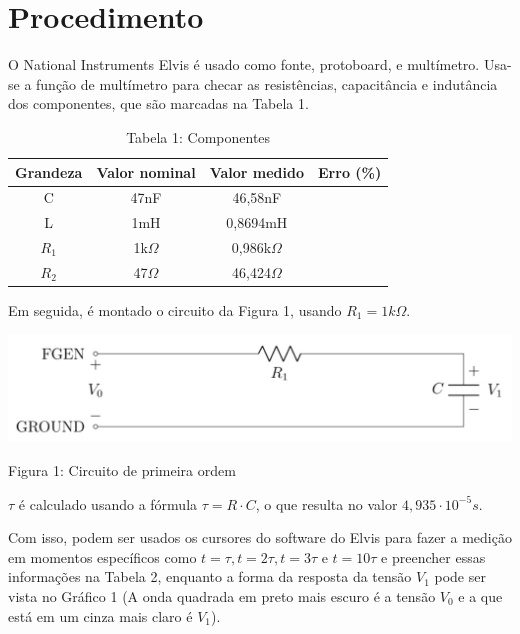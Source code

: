 \documentclass[a4 paper]{article}
\newcommand{\parag}{\hspace{30pt}}
\begin{document}
\newpage
\section{Procedimento}

\parag O National Instruments Elvis é usado como fonte, protoboard, e multímetro. Usa-se a função de multímetro para checar as resistências, capacitância e indutância dos componentes, que são marcadas na Tabela 1.

\vspace{5pt}
\begin{table}[h]
\centering
\begin{tabular}{|c|c|c|c|}
\hline
Grandeza & Valor nominal & Valor medido & Erro (\%) \\\hline
C & 47nF & 46,58nF & \\    \hline
L & 1mH & 0,8694mH & \\    \hline
$R_1$ & 1k$\Omega$ & 0,986k$\Omega$ & \\\hline
$R_2$ & 47$\Omega$ & 46,424$\Omega$ & \\\hline
\end{tabular}
\caption*{Tabela 1: Componentes}
\end{table}

Em seguida, é montado o circuito da Figura 1, usando $R_1=1k\Omega$.

\begin{table}[h]
\centering
\includegraphics[scale=0.3]{figuras/figura1}
\end{table}

\begin{center}
Figura 1: Circuito de primeira ordem
\end{center}

$\tau$ é calculado usando a fórmula $\tau = R\cdot C$, o que resulta no valor $4,935\cdot10^{-5}s$.

Com isso, podem ser usados os cursores do software do Elvis para fazer a medição em momentos específicos como $t=\tau, t=2\tau, t=3\tau$ e $t=10\tau$ e preencher essas informações na Tabela 2, enquanto a forma da resposta da tensão $V_1$ pode ser vista no Gráfico 1 (A onda quadrada em preto mais escuro é a tensão $V_0$ e a que está em um cinza mais claro é $V_1$).
\end{document}
